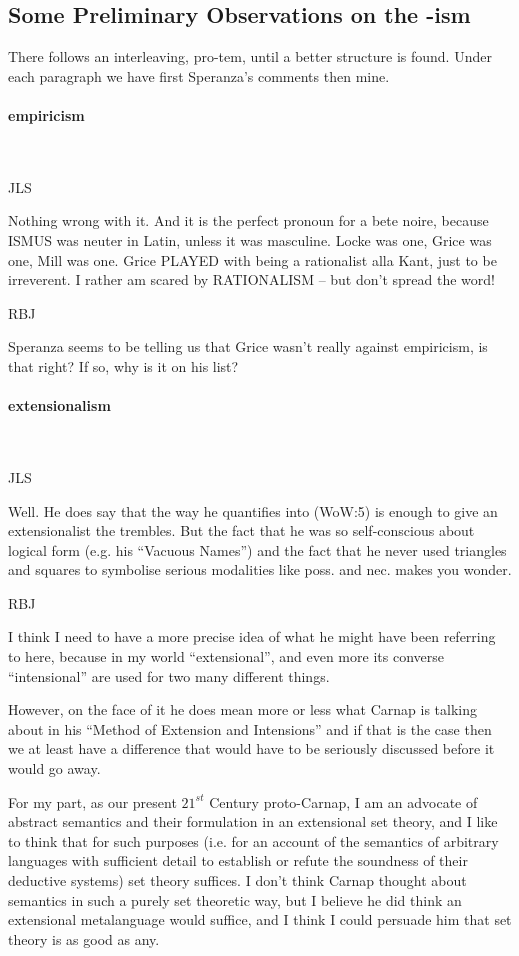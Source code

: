 \documentclass[10pt,titlepage]{book}
\begin{document}
 
\subsection{Some Preliminary Observations on the -ism}

There follows an interleaving, pro-tem, until a better structure is found.
Under each paragraph we have first Speranza's comments then mine.


\paragraph{empiricism}\ 

JLS

Nothing wrong with it. And it is the perfect pronoun for a bete 
 noire, because ISMUS was neuter in Latin, unless it was masculine. Locke 
was  one, Grice was one, Mill was one. Grice PLAYED with being a rationalist 
alla  Kant, just to be irreverent.
I rather am scared by RATIONALISM -- but 
don't  spread the word!
 
RBJ

Speranza seems to be telling us that Grice wasn't really against empiricism, is that right?
If so, why is it on his list?
 
\paragraph{extensionalism}\ 

JLS

Well. He does say that the way he quantifies into (WoW:5)  
is enough to give an extensionalist the trembles. But the fact that he was 
so  self-conscious about logical form (e.g. his ``Vacuous Names'') and the fact 
that  he never used triangles and squares to symbolise serious modalities 
like poss.  and nec. makes you wonder.

RBJ

I think I need to have a more precise idea of what he might have been referring to here, because in my world ``extensional'', and even more its converse ``intensional'' are used for two many different things.

However, on the face of it he does mean more or less what Carnap is talking about in his ``Method of Extension and Intensions'' and if that is the case then we at least have a difference that would have to be seriously discussed before it would go away.

For my part, as our present $21^{st}$ Century proto-Carnap, I am an advocate of abstract semantics and their formulation in an extensional set theory, and I like to think that for such purposes (i.e. for an account of the semantics of arbitrary languages with sufficient detail to establish or refute the soundness of their deductive systems) set theory suffices.
I don't think Carnap thought about semantics in such a purely set theoretic way, but I believe he did think an extensional metalanguage would suffice, and I think I could persuade him that set theory is as good as any.
\end{document}
